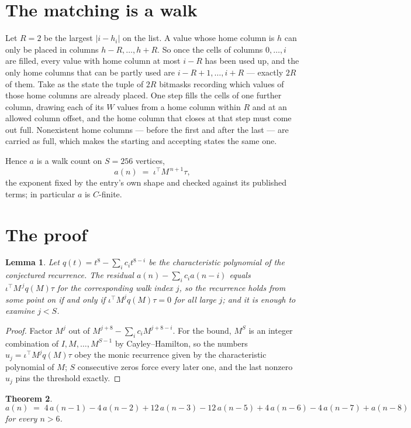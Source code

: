 \documentclass[11pt,a4paper]{article}
\theoremstyle{plain}
\newtheorem{theorem}{Theorem}
\newtheorem{lemma}[theorem]{Lemma}
\theoremstyle{definition}
\begin{document}
\section{The matching is a walk}

Let $R=2$ be the largest $|i-h_i|$ on the list. A value whose home column is $h$ can only be
placed in columns $h-R,\dots,h+R$. So once the cells of columns $0,\dots,i$ are filled, every
value with home column at most $i-R$ has been used up, and the only home columns that can be
partly used are $i-R+1,\dots,i+R$ --- exactly $2R$ of them. Take as the state the tuple of
$2R$ bitmasks recording which values of those home columns are already placed. One step fills
the cells of one further column, drawing each of its $W$ values from a home column within $R$
and at an allowed column offset, and the home column that closes at that step must come out
full. Nonexistent home columns --- before the first and after the last --- are carried as
full, which makes the starting and accepting states the same one.

Hence $a$ is a walk count on $S=256$ vertices,
\[
a(n)\;=\;\iota^{\!\top}M^{\,n+1}\tau ,
\]
the exponent fixed by the entry's own shape and checked against its published terms; in
particular $a$ is $C$-finite.

\section{The proof}

\begin{lemma}\label{lem:crit}
Let $q(t)=t^{8}-\sum_i c_it^{8-i}$ be the characteristic polynomial of the
conjectured recurrence. The residual $a(n)-\sum_ic_ia(n-i)$ equals
$\iota^{\!\top}M^{\,j}q(M)\tau$ for the corresponding walk index $j$, so the recurrence
holds from some point on if and only if $\iota^{\!\top}M^{j}q(M)\tau=0$ for all large $j$;
and it is enough to examine $j<S$.
\end{lemma}

\begin{proof}
Factor $M^{j}$ out of $M^{j+8}-\sum_ic_iM^{j+8-i}$. For the bound, $M^{S}$
is an integer combination of $I,M,\dots,M^{S-1}$ by Cayley--Hamilton, so the numbers
$u_j=\iota^{\!\top}M^{j}q(M)\tau$ obey the monic recurrence given by the characteristic
polynomial of $M$; $S$ consecutive zeros force every later one, and the last nonzero $u_j$
pins the threshold exactly.
\end{proof}

\begin{theorem}
\[
a(n)\;=\;4\,a(n-1) - 4\,a(n-2) + 12\,a(n-3) - 12\,a(n-5) + 4\,a(n-6) - 4\,a(n-7) + a(n-8)
\]
for every $n>6$.
\end{theorem}
\end{document}

